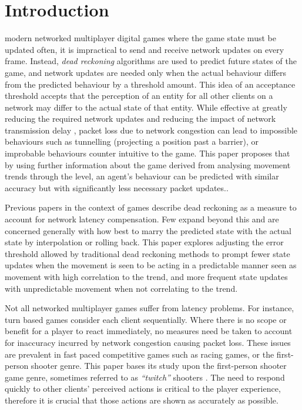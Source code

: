 \documentclass[journal]{IEEEtran}
\begin{document}
\section{Introduction} \label{intro}
% 
% 
% 

 modern networked multiplayer digital games where the game state must be updated often, it is impractical to send and receive network updates on every frame. Instead, \textit{dead reckoning} algorithms are used to predict future states of the game, and network updates are needed only when the actual behaviour differs from the predicted behaviour by a threshold amount. This idea of an acceptance threshold accepts that the perception of an entity for all other clients on a network may differ to the actual state of that entity. While effective at greatly reducing the required network updates and reducing the impact of network transmission delay \cite{pantel2002suitability}, packet loss due to network congestion can lead to impossible behaviours such as tunnelling (projecting a position past a barrier), or improbable behaviours counter intuitive to the game. This paper proposes that by using further information about the game derived from analysing movement trends through the level, an agent's behaviour can be predicted with similar accuracy but with significantly less necessary packet updates..

Previous papers in the context of games describe dead reckoning as a measure to account for network latency compensation. Few expand beyond this and are concerned generally with how best to marry the predicted state with the actual state by interpolation or rolling back. This paper explores adjusting the error threshold allowed by traditional dead reckoning methods to prompt fewer state updates when the movement is seen to be acting in a predictable manner seen as movement with high correlation to the trend, and more frequent state updates with unpredictable movement when not correlating to the trend.

Not all networked multiplayer games suffer from latency problems. For instance, turn based games consider each client sequentially. Where there is no scope or benefit for a player to react immediately, no measures need be taken to account for inaccuracy incurred by network congestion causing packet loss. These issues are prevalent in fast paced competitive games such as racing games, or the first-person shooter genre. This paper bases its study upon the first-person shooter game genre, sometimes referred to as \textit{``twitch''} shooters \cite{lee2015outatime}. The need to respond quickly to other clients' perceived actions is critical to the player experience, therefore it is crucial that those actions are shown as accurately as possible.
\end{document}
